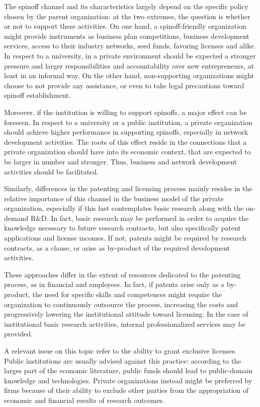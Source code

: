 The spinoff channel and its characteristics largely depend on the specific policy chosen by the parent organization: at the two extremes, the question is whether or not to support these activities. On one hand, a spinoff-friendly organization might provide instruments as business plan competitions, business development services, access to their industry networks, seed funds, favoring licenses and alike. In respect to a university, in a private environment should be expected a stronger pressure and larger responsibilities and accountability over new entrepreneurs, at least in an informal way. On the other hand, non-supporting organizations might choose to not provide any assistance, or even to take legal precautions toward spinoff establishment.

Moreover, if the institution is willing to support spinoffs, a major effect can be foreseen. In respect to a university or a public institution, a private organization should achieve higher performance in supporting spinoffs, especially in network development activities. The roots of this effect reside in the connections that a private organization should have into its economic context, that are expected to be larger in number and stronger. Thus, business and network development activities should be facilitated.

Similarly, differences in the patenting and licensing process mainly resides in the relative importance of this channel in the business model of the private organization, especially if this last contemplates basic research along with the on-demand R\&D. In fact, basic research may be performed in order to acquire the knowledge necessary to future research contracts, but also specifically patent applications and license incomes. If not, patents might be required by research contracts, as a clause, or arise as by-product of the required development activities.

These approaches differ in the extent of resources dedicated to the patenting process, as in financial and employees. In fact, if patents arise only as a by-product, the need for specific skills and competences might require the organization to continuously outsource the process, increasing the costs and progressively lowering the institutional attitude toward licensing. In the case of institutional basic research activities, internal professionalized services may be provided.

A relevant issue on this topic refer to the ability to grant exclusive licenses. Public institutions are usually advised against this practice: according to the larges part of the economic literature, public funds should lead to public-domain knowledge and technologies. Private organizations instead might be preferred by firms because of their ability to exclude other parties from the appropriation of economic and financial results of research outcomes.

